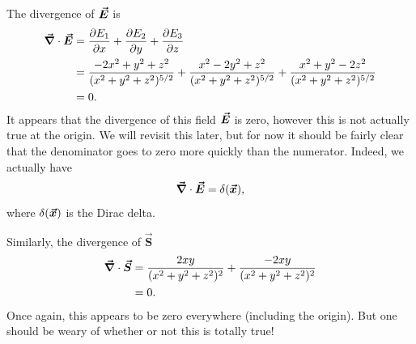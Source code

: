 \documentclass[12pt]{article} %
\begin{document}
\begin{solution}
    The divergence of $\boldsymbol{\vec{E}}$ is
    \begin{align*}
        \boldsymbol{\vec{\nabla}} \cdot \boldsymbol{\vec{E}} &= \frac{\partial E_1}{\partial x} + \frac{\partial E_2}{\partial y} + \frac{\partial E_3}{\partial z}\\
        &= \frac{-2x^2+y^2+z^2}{(x^2+y^2+z^2)^{5/2}} + \frac{x^2-2y^2+z^2}{(x^2+y^2+z^2)^{5/2}} + \frac{x^2+y^2-2z^2}{(x^2+y^2+z^2)^{5/2}}\\
        &= 0.
    \end{align*}
    It appears that the divergence of this field $\boldsymbol{\vec{E}}$ is zero, however this is not actually true at the origin. We will revisit this later, but for now it should be fairly clear that the denominator goes to zero more quickly than the numerator. Indeed, we actually have
    \[
        \boldsymbol{\vec{\nabla}} \cdot \boldsymbol{\vec{E}} = \delta(\boldsymbol{\vec{x}}),
    \]
    where $\delta(\boldsymbol{\vec{x}})$ is the Dirac delta.
    
    Similarly, the divergence of $\boldsymbol{\vec{S}}$
    \begin{align*}
        \boldsymbol{\vec{\nabla}} \cdot \boldsymbol{\vec{S}} &= \frac{2xy}{(x^2+y^2+z^2)^2} + \frac{-2xy}{(x^2+y^2+z^2)^2}\\
        &=0.
    \end{align*}
    Once again, this appears to be zero everywhere (including the origin). But one should be weary of whether or not this is totally true!
\end{solution}
\end{document}
